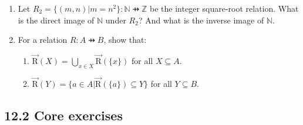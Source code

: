 \documentclass[10pt,\jkfside,a4paper]{article}
\begin{document}
\begin{enumerate}

\item Let $R_2 = \{(m, n) | m = n^2\}: \mathbb{N} \pfun \mathbb{Z}$ be the integer square-root relation. What is the 
direct image of $\mathbb{N}$ under $R_2$? And what is the inverse image of $\mathbb{N}$.



\item For a relation $R: A \pfun B$, show that:

\begin{enumerate}

\item $\overrightarrow{\text{R}}(X) = \bigcup_{x \in X} \overrightarrow{\text{R}}(\{x\})$ for all $X \subseteq A$.



\item $\overrightarrow{\text{R}}(Y) = \{a \in A | \overrightarrow{\text{R}}(\{a\}) \subseteq Y \}$ for all $Y \subseteq B$.



\end{enumerate}

\end{enumerate}

\subsection*{12.2 Core exercises}
\end{document}
